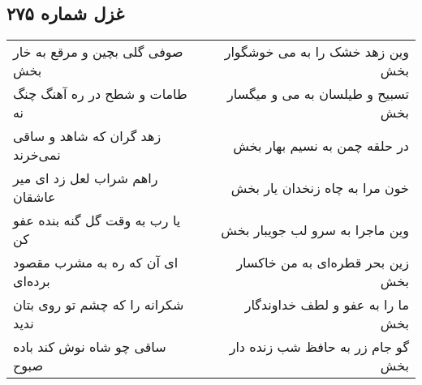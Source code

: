 \begin{center}
\section*{غزل شماره ۲۷۵}
\label{sec:sh275}
\begin{longtable}{l p{0.5cm} r}
صوفی گلی بچین و مرقع به خار بخش
&&
وین زهد خشک را به می خوشگوار بخش
\\
طامات و شطح در ره آهنگ چنگ نه
&&
تسبیح و طیلسان به می و میگسار بخش
\\
زهد گران که شاهد و ساقی نمی‌خرند
&&
در حلقه چمن به نسیم بهار بخش
\\
راهم شراب لعل زد ای میر عاشقان
&&
خون مرا به چاه زنخدان یار بخش
\\
یا رب به وقت گل گنه بنده عفو کن
&&
وین ماجرا به سرو لب جویبار بخش
\\
ای آن که ره به مشرب مقصود برده‌ای
&&
زین بحر قطره‌ای به من خاکسار بخش
\\
شکرانه را که چشم تو روی بتان ندید
&&
ما را به عفو و لطف خداوندگار بخش
\\
ساقی چو شاه نوش کند باده صبوح
&&
گو جام زر به حافظ شب زنده دار بخش
\\
\end{longtable}
\end{center}
